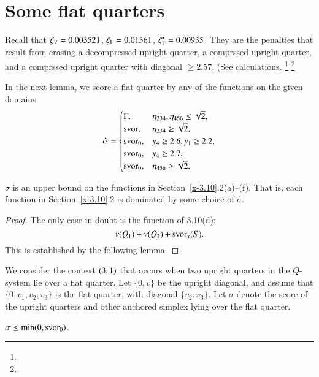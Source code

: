 \section{Some flat quarters} %
    \label{sec:some-flat}


Recall that $\xi_V=0.003521$, $\xi_\Gamma=0.01561$, $\xi_\Gamma'=0.00935$. They are
the penalties that result from erasing a 
decompressed upright quarter, a comprssed upright quarter, 
and a comprssed upright quarter
with diagonal $\ge2.57$. (See calculations.%
\footnote{} %
\footnote{} %

In the next lemma, we score a flat quarter by any of the functions
on the given domains
     $$\hat\sigma=
        \begin{cases}
            \Gamma,& \eta_{234},\eta_{456}\le\sqrt2,\\
             \operatorname{svor}, &\eta_{234}\ge\sqrt2,\\
            \operatorname{svor}_0, & y_4\ge 2.6, y_1\ge2.2,\\
            \operatorname{svor}_0, & y_4\ge 2.7,\\
            \operatorname{svor}_0,& \eta_{456}\ge\sqrt2.
        \end{cases}
    $$

\begin{lemma}
    \label{lemma:hatsigma}
$\hat\sigma$ is an upper bound on the functions in
Section~\ref{x-3.10}.2(a)--(f). That is, each function in
Section~\ref{x-3.10}.2 is dominated by some choice of $\hat\sigma$.
\end{lemma}

\begin{proof}  The only case in doubt is the function of 3.10(d):
$$\nu(Q_1)+\nu(Q_2)+\operatorname{svor}_x(S).$$ This is established by the
following lemma.
\end{proof}


We consider the context $\relax(3,1)$ that occurs when two upright
quarters in the $Q$-system lie over a flat quarter. Let $\{0,v\}$ be
the upright diagonal, and assume that $\{0,v_1,v_2,v_3\}$ is the
flat quarter, with diagonal $\{v_2,v_3\}$. Let $\sigma$ denote the
score of the upright quarters and other anchored simplex lying
over the flat quarter.

\begin{lemma}\label{lemma:min0-svor}
    $\sigma\le \min(0,\operatorname{svor}_0)$.
\end{lemma}

